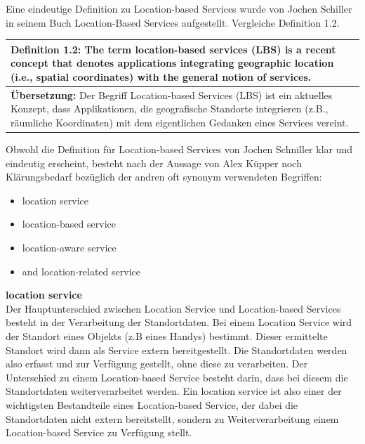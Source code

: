 Eine eindeutige Definition zu Location-based Services wurde von Jochen Schiller in seinem Buch \glqq Location-Based Services \grqq aufgestellt. Vergleiche Definition 1.2.

\begin{table}[h]
	\centering
	\begin{tabular}{|p{16cm}|}\hline
		\textbf{Definition 1.2:} \glqq The term location-based services (LBS) is a recent concept that denotes applications integrating geographic location (i.e., spatial coordinates) with the general notion of services. \grqq \cite[S.1]{Schiller2004}\\ \hline
		\textbf{Übersetzung:} Der Begriff Location-based Services (LBS) ist ein aktuelles Konzept, dass Applikationen, die geografische Standorte integrieren (z.B., räumliche Koordinaten) mit dem eigentlichen Gedanken eines Services vereint. \\ \hline
	\end{tabular}
\end{table}

Obwohl die Definition für Location-based Services von Jochen Schniller klar und eindeutig erscheint, besteht nach der Aussage von Alex Küpper noch Klärungsbedarf bezüglich der andren oft synonym verwendeten Begriffen:
\begin{itemize}
\item location service
\item location-based service
\item location-aware service
\item and location-related service
\end{itemize}



\textbf{location service} \\
Der Hauptunterschied zwischen Location Service und Location-based Services besteht in der Verarbeitung der Standortdaten. Bei einem Location Service wird der Standort eines Objekts (z.B eines Handys) bestimmt. Dieser ermittelte Standort wird dann als Service extern bereitgestellt. Die Standortdaten werden also erfasst und zur Verfügung gestellt, ohne diese zu verarbeiten.
Der Unterschied zu einem Location-based Service besteht darin, dass bei diesem die Standortdaten weiterverarbeitet werden. Ein location service ist also einer der wichtigsten Bestandteile eines Location-based Service, der dabei die Standortdaten nicht extern bereitstellt, sondern zu Weiterverarbeitung einem Location-based Service zu Verfügung stellt.
\cite[S.1-2]{Kuepper2005}

